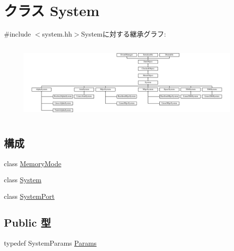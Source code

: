 \hypertarget{classSystem}{
\section{クラス System}
\label{classSystem}
}


{\ttfamily \#include $<$system.hh$>$}Systemに対する継承グラフ:\begin{figure}[H]
\begin{center}
\leavevmode
\includegraphics[height=4cm]{classSystem}
\end{center}
\end{figure}
\subsection*{構成}
\begin{DoxyCompactItemize}
\item 
class \hyperlink{classSystem_1_1MemoryMode}{MemoryMode}
\item 
class \hyperlink{classSystem_1_1System}{System}
\item 
class \hyperlink{classSystem_1_1SystemPort}{SystemPort}
\end{DoxyCompactItemize}
\subsection*{Public 型}
\begin{DoxyCompactItemize}
\item 
typedef SystemParams \hyperlink{classSystem_a5f461be6222ce76bffcb70f27d820c56}{Params}
\end{DoxyCompactItemize}
